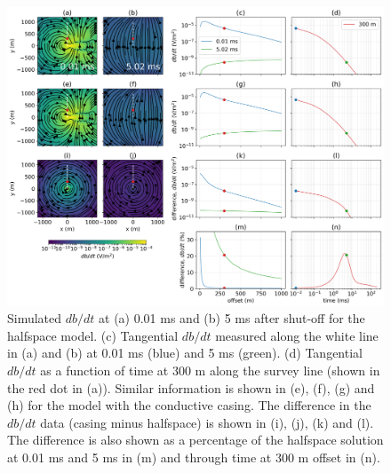 \begin{figure}
    \begin{center}
    \includegraphics[width=\textwidth]{figures/em_casing/surface_dbdt_overview.png}
    \end{center}
\caption{
    Simulated $db/dt$ at (a) 0.01 ms and (b) 5 ms after shut-off for the halfspace model.
    (c) Tangential $db/dt$ measured along the white line in (a) and (b) at 0.01 ms (blue) and 5 ms (green).
    (d) Tangential $db/dt$ as a function of time at 300 m along the survey line (shown in the red dot in (a)).
    Similar information is shown in (e), (f), (g) and (h) for the model with the conductive casing.
    The difference in the $db/dt$ data (casing minus halfspace) is shown in (i), (j), (k) and (l).
    The difference is also shown as a percentage of the halfspace solution at 0.01 ms and 5 ms in (m)
    and through time at 300 m offset in (n).
}
\label{fig:surface_dbdt_overview}
\end{figure}



